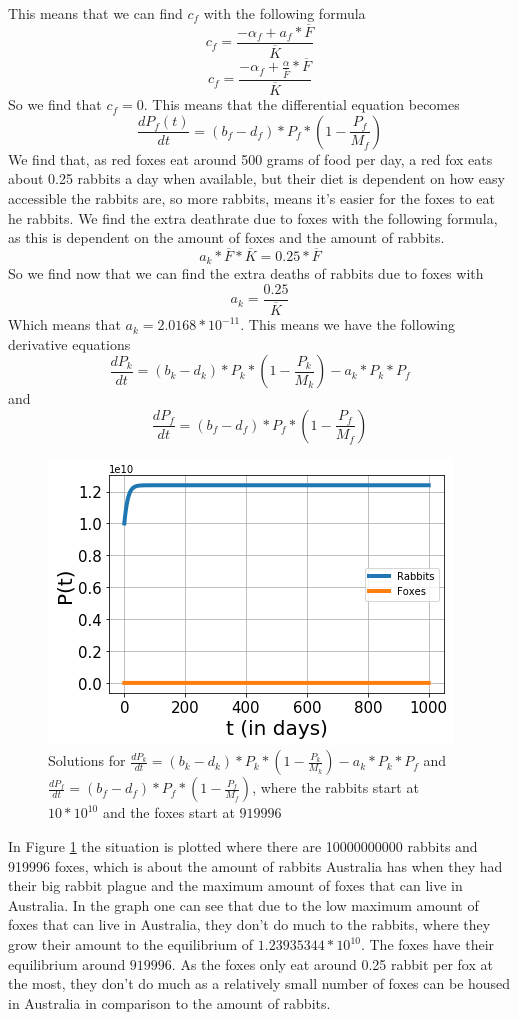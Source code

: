 \documentclass{article}
\begin{document}
This means that we can find $c_f$ with the following formula
$$c_f=\frac{-\alpha_f+a_f*\overline{F}}{\overline{K}}$$
$$c_f=\frac{-\alpha_f+\frac{\alpha}{\overline{F}}*\overline{F}}{\overline{K}}$$
So we find that $c_f=0$. This means that the differential equation becomes 
$$\frac{dP_f(t)}{dt}=(b_f-d_f)*P_f*(1-\frac{P_f}{M_f})$$
We find that, as red foxes eat around 500 grams of food per day, a red fox eats about 0.25 rabbits a day when available, but their diet is dependent on how easy accessible the rabbits are, so more rabbits, means it's easier for the foxes to eat he rabbits.\cite{FoxFood} We find the extra deathrate due to foxes with the following formula, as this is dependent on the amount of foxes and the amount of rabbits.
$$a_k*\overline{F}*\overline{K}=0.25*\overline{F}$$
So we find now that we can find the extra deaths of rabbits due to foxes with
$$a_k=\frac{0.25}{\overline{K}}$$
Which means that $a_k=2.0168*10^{-11}$. This means we have the following derivative equations
$$\frac{dP_k}{dt}=(b_k-d_k)*P_k*(1-\frac{P_k}{M_k})-a_k*P_k*P_f$$
and
$$\frac{dP_f}{dt}=(b_f-d_f)*P_f*(1-\frac{P_f}{M_f})$$
\begin{figure}[ht!]
    \centering
    \includegraphics[scale=0.78]{Pictures/RabbitFoxes.png}
    \caption{Solutions for $\frac{dP_k}{dt}=(b_k-d_k)*P_k*(1-\frac{P_k}{M_k})-a_k*P_k*P_f$ and $\frac{dP_f}{dt}=(b_f-d_f)*P_f*(1-\frac{P_f}{M_f})$, where the rabbits start at $10*10^{10}$ and the foxes start at $919996$}
    \label{fig:RabbitFoxes}
\end{figure}
In Figure \ref{fig:RabbitFoxes} the situation is plotted where there are 10000000000 rabbits and 919996 foxes, which is about the amount of rabbits Australia has when they had their big rabbit plague and the maximum amount of foxes that can live in Australia. In the graph one can see that due to the low maximum amount of foxes that can live in Australia, they don't do much to the rabbits, where they grow their amount to the equilibrium of $1.23935344*10^10$. The foxes have their equilibrium around $919996$. As the foxes only eat around 0.25 rabbit per fox at the most, they don't do much as a relatively small number of foxes can be housed in Australia in comparison to the amount of rabbits. 
\end{document}
